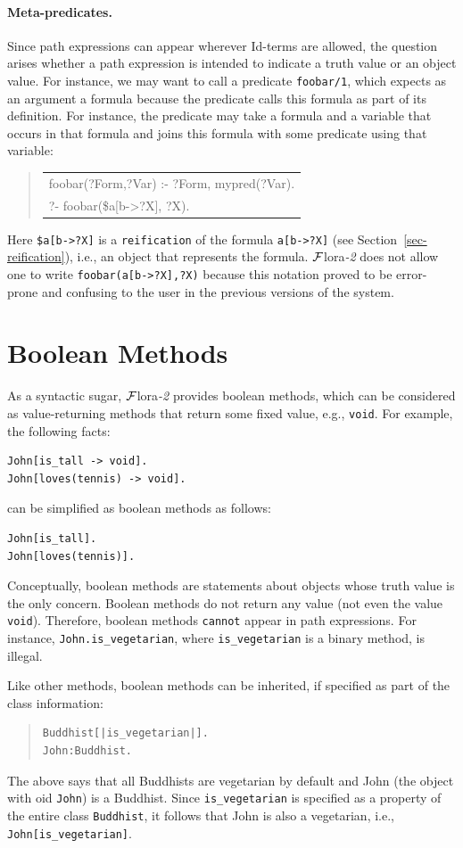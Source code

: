 \documentclass[11pt]{article}
\newcommand{\FLORA}{{\mbox{\sc ${\cal F}${lora}\rm\emph{-2}}}\xspace}
\newcommand{\FLSYSTEM}{\FLORA}
\newenvironment{qrules}{\begin{quote}\tt\begin{tabular}[t]{l}}%
{\end{tabular}\end{quote}}
\begin{document}
\paragraph{Meta-predicates.}
Since path expressions can appear wherever Id-terms are allowed, the
question arises whether a path expression is intended to indicate a truth
value or an object value. For instance, we may want to call a
predicate {\tt foobar/1}, which expects as an argument
a formula because the predicate calls this formula as part of its definition.
For instance, the predicate may take a formula and a variable that occurs
in that formula and joins this formula with some predicate using that
variable:
\begin{qrules}
  foobar(?Form,?Var) :- ?Form, mypred(?Var).\\
  ?- foobar(\${a[b->?X]}, ?X).
\end{qrules}
Here \texttt{\${a[b->?X]}} is a \texttt{reification} of the formula
\texttt{a[b->?X]} (see Section~\ref{sec-reification}), i.e., an object that
represents the formula.  \FLSYSTEM does not allow one to write
\texttt{foobar(a[b->?X],?X)} because this notation proved to be error-prone
and confusing to the user in the previous versions of the system.



\section{Boolean Methods}


As a syntactic sugar, \FLSYSTEM provides boolean methods, which can be
considered as value-returning methods that return some fixed value, e.g.,
{\tt void}. For example, the following facts:
\begin{verbatim}
John[is_tall -> void].
John[loves(tennis) -> void].
\end{verbatim}
can be simplified as boolean methods as follows:
\begin{verbatim}
John[is_tall].
John[loves(tennis)].
\end{verbatim}

Conceptually, boolean methods are statements about objects whose truth
value is the only concern. Boolean methods do not return any value (not
even the value {\tt void}). Therefore, boolean methods {\tt cannot} appear
in path expressions. For instance, \mbox{\tt John.is\_vegetarian}, where
{\tt is\_vegetarian} is a binary method, is illegal.

Like other methods, boolean methods can be inherited, if specified as part
of the class information:
\begin{quote}
\begin{verbatim}
Buddhist[|is_vegetarian|].
John:Buddhist.
\end{verbatim}
\end{quote}
The above says that all Buddhists are vegetarian by default
and John (the object with
oid {\tt John}) is a Buddhist. Since \verb|is_vegetarian| is specified as a
property of the entire class \texttt{Buddhist},
it follows that John is also a vegetarian, i.e.,
\verb|John[is_vegetarian]|.
\end{document}
